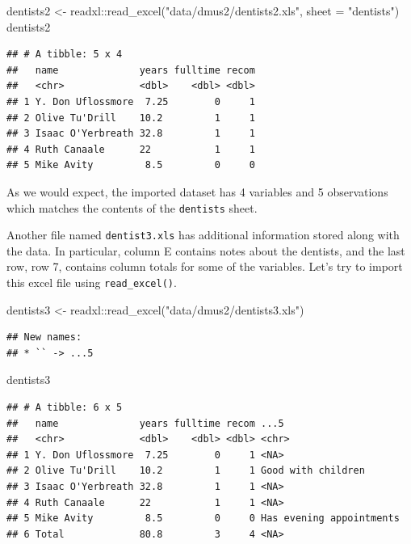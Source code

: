 \documentclass[
]{book}
\newenvironment{Shaded}{\begin{snugshade}}{\end{snugshade}}
\newcommand{\AttributeTok}[1]{\textcolor[rgb]{0.77,0.63,0.00}{#1}}
\newcommand{\FunctionTok}[1]{\textcolor[rgb]{0.00,0.00,0.00}{#1}}
\newcommand{\NormalTok}[1]{#1}
\newcommand{\OtherTok}[1]{\textcolor[rgb]{0.56,0.35,0.01}{#1}}
\newcommand{\SpecialCharTok}[1]{\textcolor[rgb]{0.00,0.00,0.00}{#1}}
\newcommand{\StringTok}[1]{\textcolor[rgb]{0.31,0.60,0.02}{#1}}
\begin{document}
\begin{Shaded}
\begin{Highlighting}[]
\NormalTok{dentists2 }\OtherTok{\textless{}{-}}\NormalTok{ readxl}\SpecialCharTok{::}\FunctionTok{read\_excel}\NormalTok{(}\StringTok{"data/dmus2/dentists2.xls"}\NormalTok{, }\AttributeTok{sheet =} \StringTok{"dentists"}\NormalTok{)}
\NormalTok{dentists2}
\end{Highlighting}
\end{Shaded}

\begin{verbatim}
## # A tibble: 5 x 4
##   name              years fulltime recom
##   <chr>             <dbl>    <dbl> <dbl>
## 1 Y. Don Uflossmore  7.25        0     1
## 2 Olive Tu'Drill    10.2         1     1
## 3 Isaac O'Yerbreath 32.8         1     1
## 4 Ruth Canaale      22           1     1
## 5 Mike Avity         8.5         0     0
\end{verbatim}

As we would expect, the imported dataset has 4 variables and 5 observations which matches the contents of the \texttt{dentists} sheet.

Another file named \texttt{dentist3.xls} has additional information stored along with the data. In particular, column E contains notes about the dentists, and the last row, row 7, contains column totals for some of the variables. Let's try to import this excel file using \texttt{read\_excel()}.

\begin{Shaded}
\begin{Highlighting}[]
\NormalTok{dentists3 }\OtherTok{\textless{}{-}}\NormalTok{ readxl}\SpecialCharTok{::}\FunctionTok{read\_excel}\NormalTok{(}\StringTok{"data/dmus2/dentists3.xls"}\NormalTok{)}
\end{Highlighting}
\end{Shaded}

\begin{verbatim}
## New names:
## * `` -> ...5
\end{verbatim}

\begin{Shaded}
\begin{Highlighting}[]
\NormalTok{dentists3}
\end{Highlighting}
\end{Shaded}

\begin{verbatim}
## # A tibble: 6 x 5
##   name              years fulltime recom ...5                    
##   <chr>             <dbl>    <dbl> <dbl> <chr>                   
## 1 Y. Don Uflossmore  7.25        0     1 <NA>                    
## 2 Olive Tu'Drill    10.2         1     1 Good with children      
## 3 Isaac O'Yerbreath 32.8         1     1 <NA>                    
## 4 Ruth Canaale      22           1     1 <NA>                    
## 5 Mike Avity         8.5         0     0 Has evening appointments
## 6 Total             80.8         3     4 <NA>
\end{verbatim}
\end{document}
